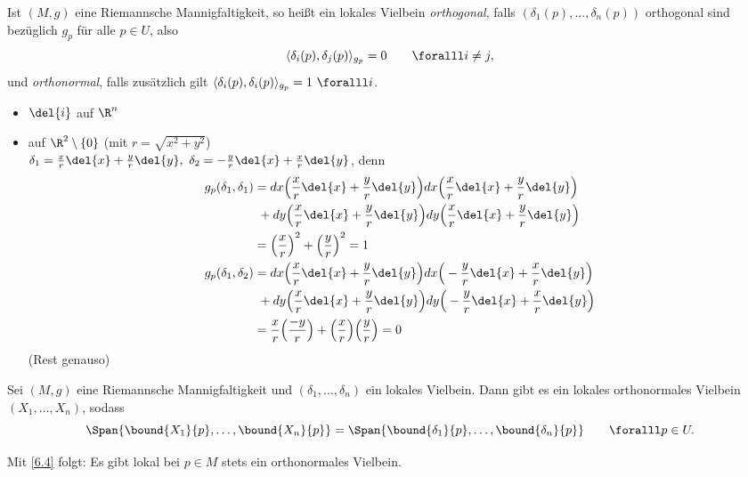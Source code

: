 \begin{defn*}
	Ist $(M,g)$ eine Riemannsche Mannigfaltigkeit, so heißt ein lokales Vielbein \emph{orthogonal}, falls $ (\delta_1(p), \dotsc, \delta_n(p)) $ orthogonal sind bezüglich $g_p$ für alle $p \in U$, also
	\[ \langle \delta_i (p), \delta_j(p) \rangle_{g_p} = 0 \qquad \foralll i \neq j, \]
	und \emph{orthonormal}, falls zusätzlich gilt $ \langle \delta_i (p), \delta_i(p) \rangle_{g_p} = 1 \ \foralll i$.
\end{defn*}

\begin{exmp*}
	\begin{itemize}
		\item $ \del{i} $ auf $\R^n$
		\item auf $\R^2 \setminus \{0\} $ (mit $r = \sqrt{x^2+y^2}$)\\
			$ \delta_1 = \frac{x}{r} \del{x} + \frac{y}{r} \del{y},\ \delta_2 = -\frac{y}{r} \del{x} + \frac{x}{r} \del{y} $, denn
			\begin{align*}
				g_p(\delta_1,\delta_1) &= dx \Big(\frac{x}{r} \del{x} + \frac{y}{r} \del{y}\Big) dx \Big( \frac{x}{r} \del{x} + \frac{y}{r} \del{y} \Big)\\
				&\ + dy \Big( \frac{x}{r} \del{x} + \frac{y}{r} \del{y} \Big) dy \Big( \frac{x}{r} \del{x} + \frac{y}{r} \del{y} \Big)\\
				&= \Big(\frac{x}{r}\Big)^2 + \Big(\frac{y}{r}\Big)^2 = 1\\
				g_p(\delta_1,\delta_2) &= dx \Big(\frac{x}{r} \del{x} + \frac{y}{r} \del{y}\Big) dx \Big(-\frac{y}{r} \del{x} + \frac{x}{r} \del{y}\Big)\\
				&\ + dy \Big( \frac{x}{r} \del{x} + \frac{y}{r} \del{y} \Big) dy \Big( -\frac{y}{r} \del{x} + \frac{x}{r} \del{y} \Big)\\
				&= \frac{x}{r}\Big(\frac{-y}{r}\Big) + \Big(\frac{x}{r}\Big)\Big(\frac{y}{r}\Big) = 0
			\end{align*}
			(Rest genauso)
	\end{itemize}
\end{exmp*}

\begin{lem}
	Sei $ (M,g) $ eine Riemannsche Mannigfaltigkeit und $ (\delta_1, \dotsc, \delta_n) $ ein lokales Vielbein. Dann gibt es ein lokales orthonormales Vielbein $ (X_1,\dotsc,X_n) $, sodass
	\[ \Span \{\bound{X_1}{p},\dotsc,\bound{X_n}{p}\} = \Span\{ \bound{\delta_1}{p}, \dotsc, \bound{\delta_n}{p} \}\qquad \foralll p \in U. \]
\end{lem}

\begin{cor*}
	Mit \ref{6.4} folgt: Es gibt lokal bei $p \in M$ stets ein orthonormales Vielbein.
\end{cor*}
